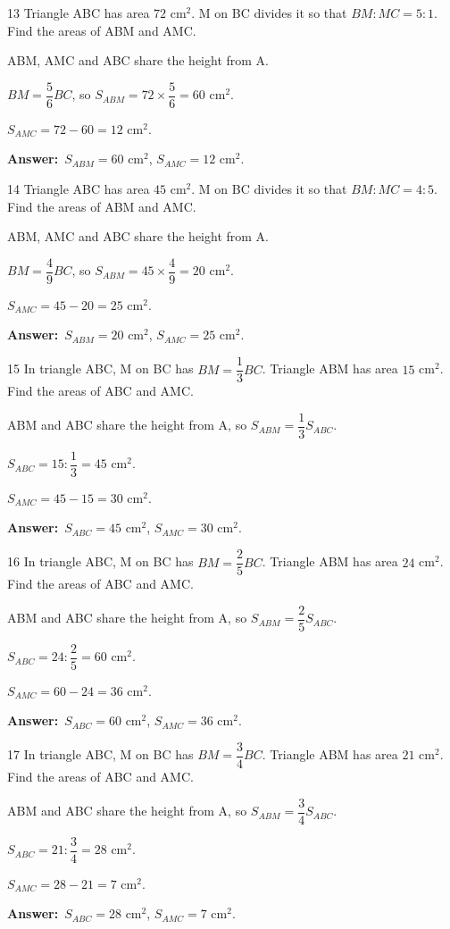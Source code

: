 \documentclass[11pt]{article}
\newif\ifsol \solfalse
\providecommand{\AnsWord}{Đáp số}
\newcommand{\dapso}[1]{\par\textbf{\AnsWord:}\ #1}
\newcommand{\probsol}[1]{%
  \begin{lrbox}{\solmeasure}\begin{minipage}{\dimexpr\linewidth-24pt\relax}#1\end{minipage}\end{lrbox}%
  \ifsol
    \begin{solbox}#1\end{solbox}%
  \else
    \setlength{\solht}{\dimexpr\ht\solmeasure+\dp\solmeasure+0.85cm\relax}%
    \ifdim\solht<1.35cm\setlength{\solht}{1.35cm}\fi
    \begin{tcolorbox}[colback=white,colframe=Line,boxrule=0.8pt,arc=5pt,
      left=8pt,right=8pt,top=4pt,bottom=4pt,height=\solht]{\footnotesize\color{Slate}\itshape\WorkWord}\end{tcolorbox}%
  \fi}
\newcommand{\gap}{\vspace{0.3cm}}
\def\WorkWord{Your work:}
\def\AnsWord{Answer}
\begin{document}
\gap
\begin{probbox}{13}{\relax}
Triangle ABC has area $72$ cm$^2$. M on BC divides it so that $BM:MC=5:1$. Find the areas of ABM and AMC.
\end{probbox}
\probsol{
ABM, AMC and ABC share the height from A.\par $BM=\dfrac{5}{6}BC$, so $S_{ABM}=72\times\dfrac{5}{6}=60$ cm$^2$.\par $S_{AMC}=72-60=12$ cm$^2$.
\dapso{$S_{ABM}=60$ cm$^2$, $S_{AMC}=12$ cm$^2$.}}
\gap
\begin{probbox}{14}{\relax}
Triangle ABC has area $45$ cm$^2$. M on BC divides it so that $BM:MC=4:5$. Find the areas of ABM and AMC.
\end{probbox}
\probsol{
ABM, AMC and ABC share the height from A.\par $BM=\dfrac{4}{9}BC$, so $S_{ABM}=45\times\dfrac{4}{9}=20$ cm$^2$.\par $S_{AMC}=45-20=25$ cm$^2$.
\dapso{$S_{ABM}=20$ cm$^2$, $S_{AMC}=25$ cm$^2$.}}
\gap
\begin{probbox}{15}{\relax}
In triangle ABC, M on BC has $BM=\dfrac{1}{3}BC$. Triangle ABM has area $15$ cm$^2$. Find the areas of ABC and AMC.
\end{probbox}
\probsol{
ABM and ABC share the height from A, so $S_{ABM}=\dfrac{1}{3}S_{ABC}$.\par $S_{ABC}=15:\dfrac{1}{3}=45$ cm$^2$.\par $S_{AMC}=45-15=30$ cm$^2$.
\dapso{$S_{ABC}=45$ cm$^2$, $S_{AMC}=30$ cm$^2$.}}
\gap
\begin{probbox}{16}{\relax}
In triangle ABC, M on BC has $BM=\dfrac{2}{5}BC$. Triangle ABM has area $24$ cm$^2$. Find the areas of ABC and AMC.
\end{probbox}
\probsol{
ABM and ABC share the height from A, so $S_{ABM}=\dfrac{2}{5}S_{ABC}$.\par $S_{ABC}=24:\dfrac{2}{5}=60$ cm$^2$.\par $S_{AMC}=60-24=36$ cm$^2$.
\dapso{$S_{ABC}=60$ cm$^2$, $S_{AMC}=36$ cm$^2$.}}
\gap
\begin{probbox}{17}{\relax}
In triangle ABC, M on BC has $BM=\dfrac{3}{4}BC$. Triangle ABM has area $21$ cm$^2$. Find the areas of ABC and AMC.
\end{probbox}
\probsol{
ABM and ABC share the height from A, so $S_{ABM}=\dfrac{3}{4}S_{ABC}$.\par $S_{ABC}=21:\dfrac{3}{4}=28$ cm$^2$.\par $S_{AMC}=28-21=7$ cm$^2$.
\dapso{$S_{ABC}=28$ cm$^2$, $S_{AMC}=7$ cm$^2$.}}
\end{document}
